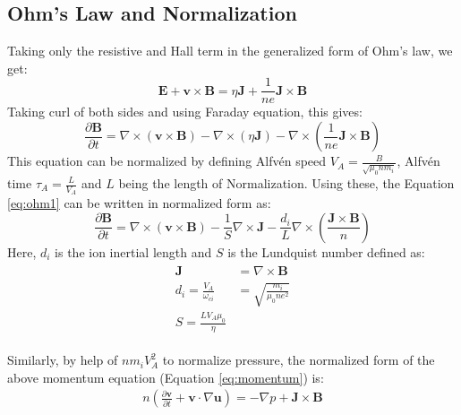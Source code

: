 \documentclass[12pt]{article}
\newenvironment{changemargin}[2]{
\begin{list}{}{
\setlength{\topsep}{0pt}
\setlength{\leftmargin}{#1}
\setlength{\rightmargin}{#2}
\setlength{\listparindent}{\parindent}
\setlength{\itemindent}{\parindent}
\setlength{\parsep}{\parskip}
}
\item[]}{\end{list}}
\begin{document}
\begin{changemargin}{-2cm}{-2cm}
    \subsection{Ohm's Law and Normalization}
    Taking only the resistive and Hall term in the generalized form of Ohm's law, we get:
    \begin{equation}
        \mathbf{E} + \mathbf{v\times B} = \eta \mathbf{J} + \frac{1}{ne}\mathbf{J\times B}
    \end{equation}
    Taking curl of both sides and using Faraday equation, this gives:
    \begin{equation}\label{eq:ohm1}
        \frac{\partial \mathbf{B}}{\partial t} = \nabla \times \left(\mathbf{v\times B}\right)- \nabla \times (\eta \mathbf{J}) -\nabla \times \left(\frac{1}{ne}\mathbf{J\times B}\right)
    \end{equation}
    This equation can be normalized by defining Alfv\'en speed $V_A = \frac{B}{\sqrt{\mu_0 n m_i}}$, Alfv\'en time $\tau_A = \frac{L}{V_A}$ and $L$ being the length of Normalization. Using these, the Equation \ref{eq:ohm1} can be written in normalized form as:
    \begin{equation}\label{eq:ohm-normal}
        \frac{\partial \mathbf{B}}{\partial t} = \nabla \times \left(\mathbf{v\times B}\right)- \frac{1}{S}\nabla \times \mathbf{J} -\frac{d_i}{L}\nabla \times \left(\frac{\mathbf{J\times B}}{n}\right)
    \end{equation}
    Here, $d_i$ is the ion inertial length and $S$ is the Lundquist number defined as:
    \begin{align}
        \begin{split}
            \mathbf{J} &= \nabla \times \mathbf{B}\\
            d_i = \frac{V_A}{\omega_{ci}} &= \sqrt{\frac{m_i}{\mu_0 n e^2}}\\
            S = \frac{LV_A\mu_0}{\eta}
        \end{split}
    \end{align}

    Similarly, by help of $nm_iV_A^2$ to normalize pressure, the normalized form of the above momentum equation (Equation \ref{eq:momentum}) is:
    \begin{eqnarray}\label{eq:momentum-normal}
        n\left(\frac{\partial \mathbf{v}}{\partial t}+\mathbf{v} \cdot \nabla \mathbf{u} \right) = -\nabla p + \mathbf{J\times B}
    \end{eqnarray}


\end{changemargin}
\end{document}
